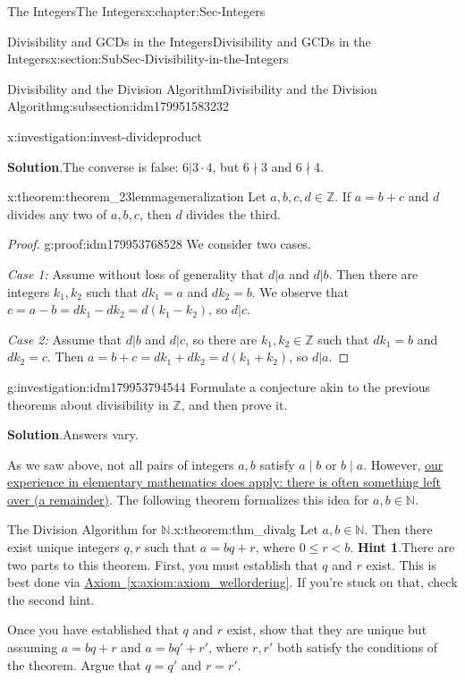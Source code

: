 \documentclass[oneside,10pt,]{book}
\newcommand{\blocktitlefont}{\relax}
\newcommand{\xreffont}{\relax}
\numberwithin{equation}{section}
\renewcommand{\le}{\leqslant}
\def\Z{{\mathbb Z}}
\def\N{{\mathbb N}}
\newcommand{\lt}{<}
\begin{document}
\begin{chapterptx}{The Integers}{}{The Integers}{}{}{x:chapter:Sec-Integers}
\begin{sectionptx}{Divisibility and GCDs in the Integers}{}{Divisibility and GCDs in the Integers}{}{}{x:section:SubSec-Divisibility-in-the-Integers}
\begin{subsectionptx}{Divisibility and the Division Algorithm}{}{Divisibility and the Division Algorithm}{}{}{g:subsection:idm179951583232}
\begin{investigation}{}{x:investigation:invest-divideproduct}
\par\smallskip%
\noindent\textbf{\blocktitlefont Solution}.\hypertarget{g:solution:idm180034204816}{}\quad{}The converse is false: \(6| 3\cdot 4\), but \(6\nmid 3\) and \(6\nmid 4\).%
\end{investigation}
\begin{theorem}{}{}{x:theorem:theorem_23lemmageneralization}%
Let \(a,b,c,d\in \Z\). If \(a = b+c\) and \(d\) divides any two of \(a,b,c\), then \(d\) divides the third.%
\end{theorem}
\begin{proof}{}{g:proof:idm179953768528}
We consider two cases.%
\par
\emph{Case 1:} Assume without loss of generality that \(d|a\) and \(d|b\). Then there are integers \(k_1, k_2\) such that \(d k_1 = a\) and \(d k_2 = b\). We observe that \(c = a - b = d k_1 - d k_2 = d(k_1 - k_2)\), so \(d|c\).%
\par
\emph{Case 2:} Assume that \(d| b\) and \(d|c\), so there are \(k_1,k_2\in \Z\) such that \(d k_1 = b\) and \(d k_2 = c\). Then \(a = b+ c = dk_1 + dk_2 = d(k_1 + k_2)\), so \(d|a\).%
\end{proof}
\begin{investigation}{}{g:investigation:idm179953794544}%
Formulate a conjecture akin to the previous theorems about divisibility in \(\Z\), and then prove it.%
\par\smallskip%
\noindent\textbf{\blocktitlefont Solution}.\hypertarget{g:solution:idm179947646064}{}\quad{}Answers vary.%
\end{investigation}
As we saw above, not all pairs of integers \(a,b\) satisfy \(a\mid b\) or \(b\mid a\). However, \href{http://www.corestandards.org/Math/Content/4/NBT/B/6/}{our experience in elementary mathematics does apply: there is often something left over (a remainder)}. The following theorem formalizes this idea for \(a,b\in \N\).%
\begin{theorem}{The Division Algorithm for \(\N\).}{}{x:theorem:thm_divalg}%
\index{Division Algorithm (\(\N\))}%
Let \(a,b\in \N\). Then there exist unique integers \(q,r\) such that \(a = bq + r\), where \(0 \le r \lt b\).%
\textbf{\blocktitlefont Hint 1}.\quad{}There are two parts to this theorem. First, you must establish that \(q\) and \(r\) exist. This is best done via \hyperref[x:axiom:axiom_wellordering]{Axiom~{\xreffont\ref{x:axiom:axiom_wellordering}}}. If you're stuck on that, check the second hint.%
\par
Once you have established that \(q\) and \(r\) exist, show that they are unique but assuming \(a = bq+r\) and \(a = bq' + r'\), where \(r,r'\) both satisfy the conditions of the theorem. Argue that \(q = q'\) and \(r = r'\).%

\end{theorem}
\end{subsectionptx}
\end{sectionptx}
\end{chapterptx}
\end{document}

